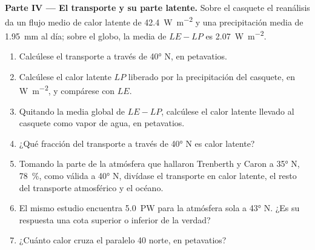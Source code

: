 \begin{problem}
\medskip
\noindent\textbf{Parte IV --- El transporte y su parte latente.} Sobre el casquete el reanálisis da un flujo medio de calor latente de \qty{42.4}{W.m^{-2}} y una precipitación media de \qty{1.95}{mm} al día; sobre el globo, la media de $LE - LP$ es \qty{2.07}{W.m^{-2}}.
\begin{enumerate}[resume]
  \item Calcúlese el transporte a través de \ang{40} N, en petavatios.
  \item Calcúlese el calor latente $LP$ liberado por la precipitación del casquete, en \unit{W.m^{-2}}, y compárese con $LE$.
  \item Quitando la media global de $LE - LP$, calcúlese el calor latente llevado al casquete como vapor de agua, en petavatios.
  \item ¿Qué fracción del transporte a través de \ang{40} N es calor latente?
  \item Tomando la parte de la atmósfera que hallaron Trenberth y Caron a \ang{35} N, \qty{78}{\percent}, como válida a \ang{40} N, divídase el transporte en calor latente, el resto del transporte atmosférico y el océano.
  \item El mismo estudio encuentra \qty{5.0}{PW} para la atmósfera sola a \ang{43} N. ¿Es su respuesta una cota superior o inferior de la verdad?
  \item ¿Cuánto calor cruza el paralelo 40 norte, en petavatios?
\end{enumerate}
\end{problem}
